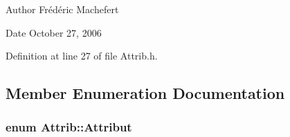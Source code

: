\begin{DoxyAuthor}{Author}
Frédéric Machefert 
\end{DoxyAuthor}
\begin{DoxyDate}{Date}
October 27, 2006 
\end{DoxyDate}


Definition at line 27 of file Attrib.h.

\subsection{Member Enumeration Documentation}
\hypertarget{classAttrib_a69e171d7cc6417835a5a306d3c764235}{
\subsubsection[{Attribut}]{\setlength{\rightskip}{0pt plus 5cm}enum {\bf Attrib::Attribut}}}
\label{classAttrib_a69e171d7cc6417835a5a306d3c764235}

